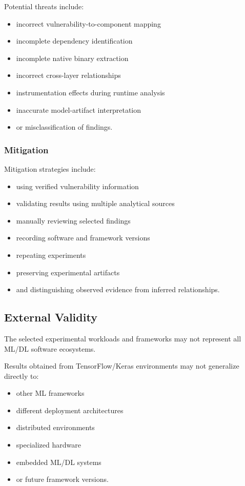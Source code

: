 \documentclass[
  12pt,
  letterpaper,
  oneside]{report}
\providecommand{\tightlist}{%
  \setlength{\itemsep}{0pt}\setlength{\parskip}{0pt}}
\begin{document}
Potential threats include:

\begin{itemize}
\tightlist
\item
  incorrect vulnerability-to-component mapping
\item
  incomplete dependency identification
\item
  incomplete native binary extraction
\item
  incorrect cross-layer relationships
\item
  instrumentation effects during runtime analysis
\item
  inaccurate model-artifact interpretation
\item
  or misclassification of findings.
\end{itemize}

\subsubsection{Mitigation}\label{mitigation}

Mitigation strategies include:

\begin{itemize}
\tightlist
\item
  using verified vulnerability information
\item
  validating results using multiple analytical sources
\item
  manually reviewing selected findings
\item
  recording software and framework versions
\item
  repeating experiments
\item
  preserving experimental artifacts
\item
  and distinguishing observed evidence from inferred relationships.
\end{itemize}

\subsection{External Validity}\label{1182-external-validity}

The selected experimental workloads and frameworks may not represent all
ML/DL software ecosystems.

Results obtained from TensorFlow/Keras environments may not generalize
directly to:

\begin{itemize}
\tightlist
\item
  other ML frameworks
\item
  different deployment architectures
\item
  distributed environments
\item
  specialized hardware
\item
  embedded ML/DL systems
\item
  or future framework versions.
\end{itemize}
\end{document}
